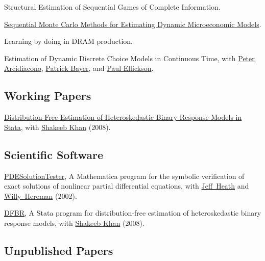 \documentclass[letterpaper]{article}
\renewenvironment{itemize}{
  \begin{list}{}{
    \setlength{\leftmargin}{1em}
  }
}{
  \end{list}
}
\begin{document}
\begin{itemize}
\item Structural Estimation of Sequential Games of Complete Information.
\item \href{http://jblevins.org/research/smcdmm}{Sequential Monte Carlo
    Methods for Estimating Dynamic Microeconomic Models}.
\item Learning by doing in DRAM production.
\item Estimation of Dynamic Discrete Choice Models in Continuous
  Time, with
  \href{http://www.econ.duke.edu/~psarcidi/}{Peter Arcidiacono},
  \href{http://www.econ.duke.edu/~pb29/}{Patrick Bayer}, and
  \href{http://www.econ.duke.edu/~paule/}{Paul Ellickson}.
\end{itemize}

\subsection*{Working Papers}

\begin{itemize}
\item \href{http://jblevins.org/research/dfbr}{Distribution-Free
    Estimation of Heteroskedastic Binary Response Models in Stata}, with
  \href{http://www.econ.duke.edu/~shakeebk/}{Shakeeb Khan} (2008).
\end{itemize}

\subsection*{Scientific Software}

\begin{itemize}
\item \href{http://jblevins.org/research/pdest}{PDESolutionTester}, A
  Mathematica program for the symbolic verification of exact solutions
  of nonlinear partial differential equations, with
  \href{http://web.centre.edu/jeffrey.heath/}{Jeff\ Heath} and
  \href{http://www.mines.edu/fs_home/whereman/}{Willy\ Hereman} (2002).
\item \href{http://jblevins.org/research/dfbr}{DFBR}, A Stata program
  for distribution-free estimation of heteroskedastic binary response
  models, with
  \href{http://www.econ.duke.edu/~shakeebk/}{Shakeeb Khan} (2008).
\end{itemize}

\subsection*{Unpublished Papers}
\end{document}
